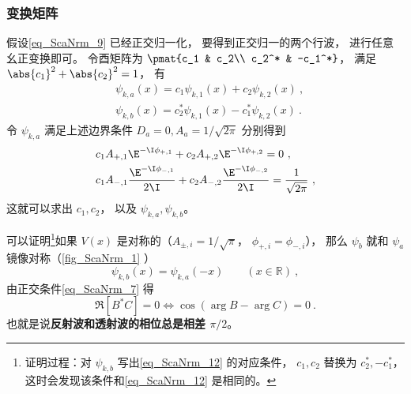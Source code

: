 \subsubsection{变换矩阵}
假设\autoref{eq_ScaNrm_9} 已经正交归一化， 要得到正交归一的两个行波， 进行任意幺正变换即可。 令酉矩阵为 $\pmat{c_1 & c_2\\ c_2^* & -c_1^*}$， 满足 $\abs{c_1}^2 + \abs{c_2}^2 = 1$， 有
\begin{equation}
\begin{aligned}
&\psi_{k,a}(x) = c_1\psi_{k,1}(x) + c_2\psi_{k,2}(x)~,\\
&\psi_{k,b}(x) = c_2^*\psi_{k,1}(x) - c_1^*\psi_{k,2}(x)~.
\end{aligned}
\end{equation}
令 $\psi_{k,a}$ 满足上述边界条件 $D_a = 0, A_a = 1/\sqrt{2\pi}$ 分别得到
\begin{equation}\label{eq_ScaNrm_12}
\begin{aligned}
&c_1 A_{+,1}\E^{-\I\phi_{+,1}} + c_2 A_{+,2}\E^{-\I\phi_{+,2}} = 0~,\\
&c_1 A_{-,1}\frac{\E^{-\I\phi_{-,1}}}{2\I} + c_2 A_{-,2}\frac{\E^{-\I\phi_{-,2}}}{2\I} = \frac{1}{\sqrt{2\pi}}~,
\end{aligned}
\end{equation}
这就可以求出 $c_1, c_2$， 以及 $\psi_{k,a}, \psi_{k,b}$。

可以证明\footnote{证明过程：对 $\psi_{k,b}$ 写出\autoref{eq_ScaNrm_12} 的对应条件， $c_1,c_2$ 替换为 $c_2^*, -c_1^*$， 这时会发现该条件和\autoref{eq_ScaNrm_12} 是相同的。}如果 $V(x)$ 是对称的（$A_{\pm,i} = 1/\sqrt{\pi}$， $\phi_{+,i}=\phi_{-,i}$）， 那么 $\psi_b$ 就和 $\psi_a$ 镜像对称（\autoref{fig_ScaNrm_1} ）
\begin{equation}
\psi_{k,b}(x) = \psi_{k,a}(-x) \qquad (x\in \mathbb{R})~,
\end{equation}
由正交条件\autoref{eq_ScaNrm_7} 得
\begin{equation}\label{eq_ScaNrm_11}
\Re[B^*C] = 0 \Longleftrightarrow \cos(\arg{B} - \arg{C}) = 0~.
\end{equation}
也就是说\textbf{反射波和透射波的相位总是相差 $\pi/2$}。


